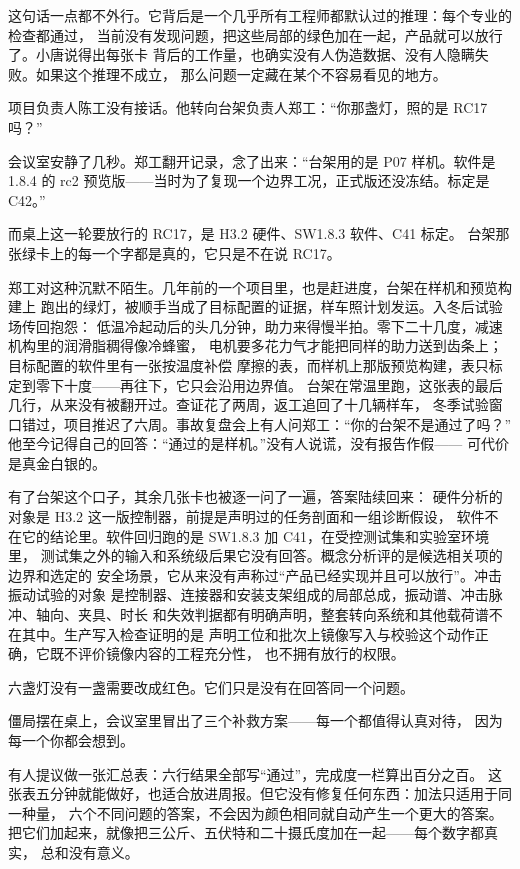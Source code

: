 这句话一点都不外行。它背后是一个几乎所有工程师都默认过的推理：每个专业的检查都通过，
当前没有发现问题，把这些局部的绿色加在一起，产品就可以放行了。小唐说得出每张卡
背后的工作量，也确实没有人伪造数据、没有人隐瞒失败。如果这个推理不成立，
那么问题一定藏在某个不容易看见的地方。

项目负责人陈工没有接话。他转向台架负责人郑工：“你那盏灯，照的是 RC17 吗？”

会议室安静了几秒。郑工翻开记录，念了出来：“台架用的是 P07 样机。软件是 1.8.4 的
rc2 预览版——当时为了复现一个边界工况，正式版还没冻结。标定是 C42。”

而桌上这一轮要放行的 RC17，是 H3.2 硬件、SW1.8.3 软件、C41 标定。
台架那张绿卡上的每一个字都是真的，它只是不在说 RC17。

郑工对这种沉默不陌生。几年前的一个项目里，也是赶进度，台架在样机和预览构建上
跑出的绿灯，被顺手当成了目标配置的证据，样车照计划发运。入冬后试验场传回抱怨：
低温冷起动后的头几分钟，助力来得慢半拍。零下二十几度，减速机构里的润滑脂稠得像冷蜂蜜，
电机要多花力气才能把同样的助力送到齿条上；目标配置的软件里有一张按温度补偿
摩擦的表，而样机上那版预览构建，表只标定到零下十度——再往下，它只会沿用边界值。
台架在常温里跑，这张表的最后几行，从来没有被翻开过。查证花了两周，返工追回了十几辆样车，
冬季试验窗口错过，项目推迟了六周。事故复盘会上有人问郑工：“你的台架不是通过了吗？”
他至今记得自己的回答：“通过的是样机。”没有人说谎，没有报告作假——
可代价是真金白银的。

有了台架这个口子，其余几张卡也被逐一问了一遍，答案陆续回来：
硬件分析的对象是 H3.2 这一版控制器，前提是声明过的任务剖面和一组诊断假设，
软件不在它的结论里。软件回归跑的是 SW1.8.3 加 C41，在受控测试集和实验室环境里，
测试集之外的输入和系统级后果它没有回答。概念分析评的是候选相关项的边界和选定的
安全场景，它从来没有声称过“产品已经实现并且可以放行”。冲击振动试验的对象
是控制器、连接器和安装支架组成的局部总成，振动谱、冲击脉冲、轴向、夹具、时长
和失效判据都有明确声明，整套转向系统和其他载荷谱不在其中。生产写入检查证明的是
声明工位和批次上镜像写入与校验这个动作正确，它既不评价镜像内容的工程充分性，
也不拥有放行的权限。

六盏灯没有一盏需要改成红色。它们只是没有在回答同一个问题。

僵局摆在桌上，会议室里冒出了三个补救方案——每一个都值得认真对待，
因为每一个你都会想到。

有人提议做一张汇总表：六行结果全部写“通过”，完成度一栏算出百分之百。
这张表五分钟就能做好，也适合放进周报。但它没有修复任何东西：加法只适用于同一种量，
六个不同问题的答案，不会因为颜色相同就自动产生一个更大的答案。
把它们加起来，就像把三公斤、五伏特和二十摄氏度加在一起——每个数字都真实，
总和没有意义。

